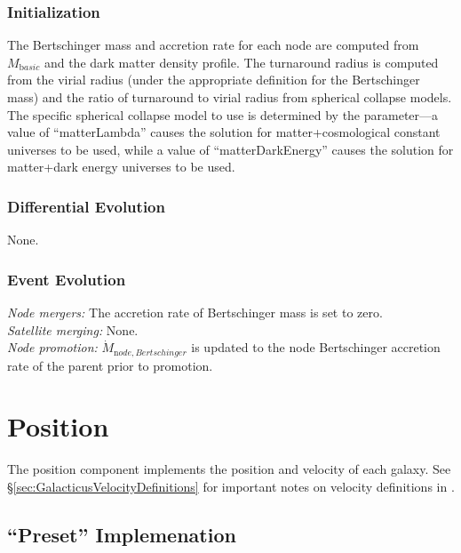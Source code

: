 \subsubsection{Initialization}

The Bertschinger mass and accretion rate for each node are computed from $M_{\mathrm basic}$ and the dark matter density profile. The turnaround radius is computed from the virial radius (under the appropriate definition for the Bertschinger mass) and the ratio of turnaround to virial radius from spherical collapse models. The specific spherical collapse model to use is determined by the {\normalfont \ttfamily [nodeComponentBasicExtendedSphericalCollapseType]} parameter---a value of ``{\normalfont \ttfamily matterLambda}'' causes the solution for matter+cosmological constant universes to be used, while a value of ``{\normalfont \ttfamily matterDarkEnergy}'' causes the solution for matter+dark energy universes to be used.

\subsubsection{Differential Evolution}

None.

\subsubsection{Event Evolution}

\noindent\emph{Node mergers:} The accretion rate of Bertschinger mass is set to zero.\\

\noindent\emph{Satellite merging:} None.\\

\noindent\emph{Node promotion:} $\dot{M}_{\mathrm node, Bertschinger}$ is updated to the \gls{node} Bertschinger accretion rate of the parent prior to promotion.\\

\section{Position}\label{sec:ComponentPosition}

The position \gls{component} implements the position and velocity of each galaxy. See \S\ref{sec:GalacticusVelocityDefinitions} for important notes on velocity definitions in \glc.

\subsection{``Preset'' Implemenation}

